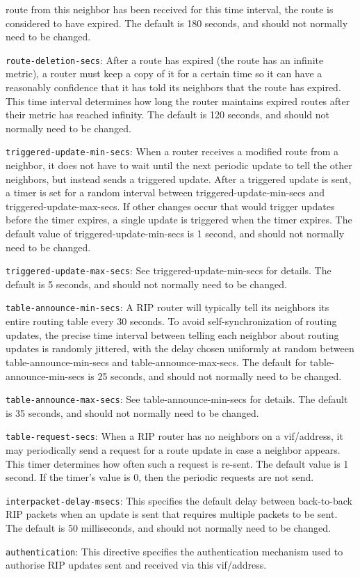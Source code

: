 \begin{description}
\begin{description}
  route from this neighbor has been received for this time interval,
  the route is considered to have expired. The default is 180 seconds,
  and should not normally need to be changed.
\item{\tt route-deletion-secs}: After a route has expired (the
  route has an infinite metric), a router must keep a copy of it for a
  certain time so it can have a reasonably confidence that it has told
  its neighbors that the route has expired.  This time interval
  determines how long the router maintains expired routes after their
  metric has reached infinity. The default is 120 seconds, and should
  not normally need to be changed.  
\item{\tt triggered-update-min-secs}: When a router receives a
  modified route from a neighbor, it does not have to wait until the
  next periodic update to tell the other neighbors, but instead sends
  a triggered update.  After a triggered update is sent, a timer is
  set for a random interval between {\stt triggered-update-min-secs}
  and {\stt triggered-update-max-secs}.  If other changes occur that
  would trigger updates before the timer expires, a single update is
  triggered when the timer expires.  The default value of {\stt
  triggered-update-min-secs} is 1 second, and should not normally need
  to be changed.
\item{\tt triggered-update-max-secs}: See {\stt
  triggered-update-min-secs} for details.  The default is 5 seconds,
  and should not normally need to be changed.
\item{\tt table-announce-min-secs}: A RIP router will typically tell
  its neighbors its entire routing table every 30 seconds.  To avoid
  self-synchronization of routing updates, the precise time interval
  between telling each neighbor about routing updates is randomly
  jittered, with the delay chosen uniformly at random between {\stt
  table-announce-min-secs} and {\stt table-announce-max-secs}.  The
  default for {\stt table-announce-min-secs} is 25 seconds, and should
  not normally need to be changed.
\item{\tt table-announce-max-secs}: See {\stt table-announce-min-secs}
  for details.  The default is 35 seconds, and should not normally
  need to be changed.
\item{\tt table-request-secs}: When a RIP router has no neighbors on a
  vif/address, it may periodically send a request for a route update
  in case a neighbor appears.  This timer determines how often such a
  request is re-sent. The default value is 1 second.
  If the timer's value is 0, then the periodic requests are not send.
\item{\tt interpacket-delay-msecs}: This specifies the default delay
  between back-to-back RIP packets when an update is sent that
  requires multiple packets to be sent.  The default is 50
  milliseconds, and should not normally need to be changed.
\item{\tt authentication}: This directive specifies the authentication
mechanism used to authorise RIP updates sent and received via this
vif/address.  


\end{description}
\end{description}
